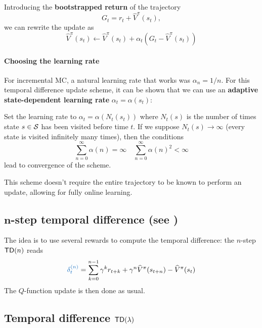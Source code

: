 \documentclass[../course-notes.tex]{subfiles}
\begin{document}
\begin{remark}
	Introducing the \textbf{bootstrapped return} of the trajectory
	\[
		G_t = r_t + \widehat{V}^\pi(s_t),
	\]
	we can rewrite the update as
	\[
		\widehat{V}^\pi(s_t) \leftarrow \widehat{V}^\pi(s_t) + \alpha_t (G_t - \widehat{V}^\pi(s_t))
	\]
\end{remark}


\paragraph{Choosing the learning rate} For incremental MC, a natural learning rate that works was $\alpha_n = 1/n$. For this temporal difference update scheme, it can be shown that we can use an \textbf{adaptive state-dependent learning rate} $\alpha_t = \alpha(s_t)$:
\begin{prop}\label{prop:ValueTD0learningRate}
	Set the learning rate to $\alpha_t = \alpha(N_t(s_t))$ where $N_t(s)$ is the number of times state $s\in\mathcal{S}$ has been visited before time $t$. If we suppose $N_t(s) \to \infty$ (every state is visited infinitely many times), then the conditions
	\begin{equation}
	\sum_{n=0}^{\infty} \alpha(n) = \infty \quad
	\sum_{n=0}^{\infty} \alpha(n)^2 < \infty
	\end{equation}
	lead to convergence of the scheme.
\end{prop}

This scheme doesn't require the entire trajectory to be known to perform an update, allowing for fully online learning.


\subsection{$\boldsymbol{n}$-step temporal difference (see \cite[chap.~7]{Sutton1998})}

The idea is to use several rewards to compute the temporal difference: the $n$-step $\mathsf{TD}(n)$ reads
\begin{equation}
	{\bluefont \delta^{(n)}_t} =
	\sum_{k=0}^{n-1} \gamma^k r_{t+k}
	+ \gamma^n \widehat{V}^\pi(s_{t+n}) - \widehat{V}^\pi(s_t)
\end{equation}
The $Q$-function update is then done as usual.



\subsection{Temporal difference $\mathsf{TD}(\lambda)$}
\end{document}
